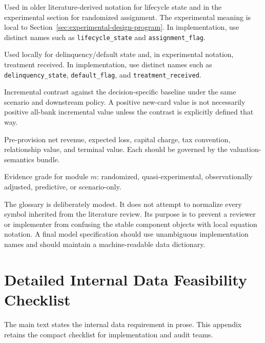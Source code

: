 \documentclass[11pt]{article}
\newcommand{\EL}{\mathrm{EL}}
\newcommand{\PPNR}{\mathrm{PPNR}}
\newcommand{\1}{\mathbf{1}}
\newcommand{\code}[1]{\nolinkurl{#1}}
\begin{document}
\begin{description}[leftmargin=*,style=nextline]
  \item[$Z$]
  Used in older literature-derived notation for lifecycle state and in the
  experimental section for randomized assignment. The experimental meaning is
  local to Section~\ref{sec:experimental-design-program}. In implementation,
  use distinct names such as \code{lifecycle_state} and
  \code{assignment_flag}.

  \item[$D$]
  Used locally for delinquency/default state and, in experimental notation,
  treatment received. In implementation, use distinct names such as
  \code{delinquency_state}, \code{default_flag}, and
  \code{treatment_received}.

  \item[$\Delta$]
  Incremental contrast against the decision-specific baseline under the same
  scenario and downstream policy. A positive new-card value is not necessarily
  positive all-bank incremental value unless the contrast is explicitly defined
  that way.

  \item[$\PPNR$, $\EL$, $Kchg$, $Tax$, $RelValue$, and $TV$]
  Pre-provision net revenue, expected loss, capital charge, tax convention,
  relationship value, and terminal value. Each should be governed by the
  valuation-semantics bundle.

  \item[$G_m$]
  Evidence grade for module $m$: randomized, quasi-experimental,
  observationally adjusted, predictive, or scenario-only.
\end{description}

The glossary is deliberately modest. It does not attempt to normalize every
symbol inherited from the literature review. Its purpose is to prevent a
reviewer or implementer from confusing the stable component objects with local
equation notation. A final model specification should use unambiguous
implementation names and should maintain a machine-readable data dictionary.

\section{Detailed Internal Data Feasibility Checklist}
\label{sec:appendix-internal-data-feasibility}

The main text states the internal data requirement in prose. This appendix
retains the compact checklist for implementation and audit teams.
\end{document}
